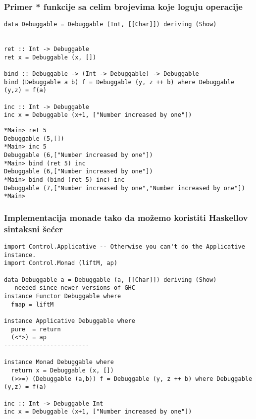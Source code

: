 \documentclass{beamer}
\begin{document}
\begin{frame}[fragile]
\frametitle{Primer * funkcije sa celim brojevima koje loguju operacije}
\begin{lstlisting}
data Debuggable = Debuggable (Int, [[Char]]) deriving (Show)


ret :: Int -> Debuggable 
ret x = Debuggable (x, [])

bind :: Debuggable -> (Int -> Debuggable) -> Debuggable
bind (Debuggable a b) f = Debuggable (y, z ++ b) where Debuggable (y,z) = f(a)

inc :: Int -> Debuggable  
inc x = Debuggable (x+1, ["Number increased by one"])
\end{lstlisting}
\end{frame}

\begin{frame}[fragile]
\begin{lstlisting}
*Main> ret 5 
Debuggable (5,[])
*Main> inc 5 
Debuggable (6,["Number increased by one"])
*Main> bind (ret 5) inc 
Debuggable (6,["Number increased by one"])
*Main> bind (bind (ret 5) inc) inc
Debuggable (7,["Number increased by one","Number increased by one"])
*Main> 
\end{lstlisting}
\end{frame}



\begin{frame}[fragile]
\frametitle{Implementacija monade tako da možemo koristiti Haskellov sintaksni šećer}
\begin{lstlisting}
import Control.Applicative -- Otherwise you can't do the Applicative instance.
import Control.Monad (liftM, ap)

data Debuggable a = Debuggable (a, [[Char]]) deriving (Show)
-- needed since newer versions of GHC
instance Functor Debuggable where
  fmap = liftM

instance Applicative Debuggable where
  pure  = return
  (<*>) = ap
------------------------

instance Monad Debuggable where 
  return x = Debuggable (x, [])
  (>>=) (Debuggable (a,b)) f = Debuggable (y, z ++ b) where Debuggable (y,z) = f(a)

inc :: Int -> Debuggable Int
inc x = Debuggable (x+1, ["Number increased by one"])
\end{lstlisting}
\end{frame}
\end{document}
